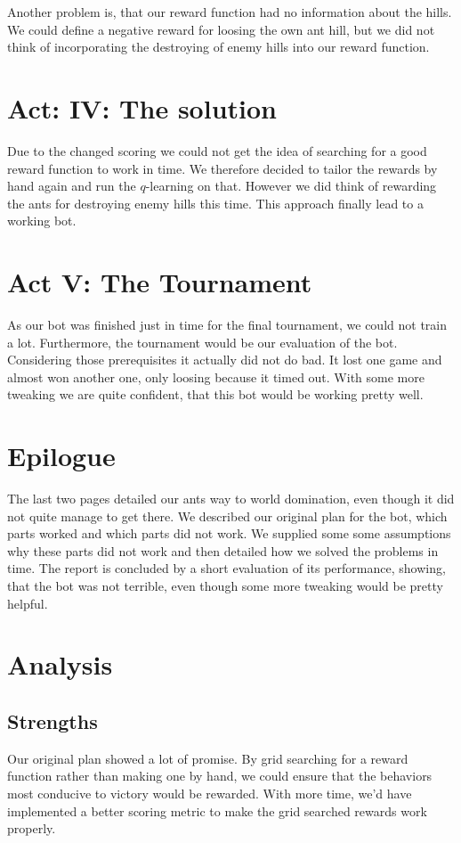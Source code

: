 \documentclass{article}
\begin{document}
Another problem is, that our reward function had no information about the hills. We could define a
negative reward for loosing the own ant hill, but we did not think of incorporating the destroying
of enemy hills into our reward function.
\section*{Act: IV: The solution}
Due to the changed scoring we could not get the idea of searching for a good reward function to
work in time. We therefore decided to tailor the rewards by hand again and run the $q$-learning on
that. However we did think of rewarding the ants for destroying enemy hills this time. This approach
finally lead to a working bot.
\section*{Act V: The Tournament}
As our bot was finished just in time for the final tournament, we could not train a lot.
Furthermore, the tournament would be our evaluation of the bot. Considering those prerequisites it
actually did not do bad. It lost one game and almost won another one, only loosing because it timed
out. With some more tweaking we are quite confident, that this bot would be working pretty well.
\section*{Epilogue}
The last two pages detailed our ants way to world domination, even though it did not quite manage to
get there. We described our original plan for the bot, which parts worked and which parts did not
work. We supplied some some assumptions why these parts did not work and then detailed how we solved
the problems in time. The report is concluded by a short evaluation of its performance, showing,
that the bot was not terrible, even though some more tweaking would be pretty helpful.
\section*{Analysis}
\subsection*{Strengths}
Our original plan showed a lot of promise. By grid searching for a reward function rather than making one by hand,
we could ensure that the behaviors most conducive to victory would be rewarded. With more time, we'd have implemented
a better scoring metric to make the grid searched rewards work properly.
\end{document}
